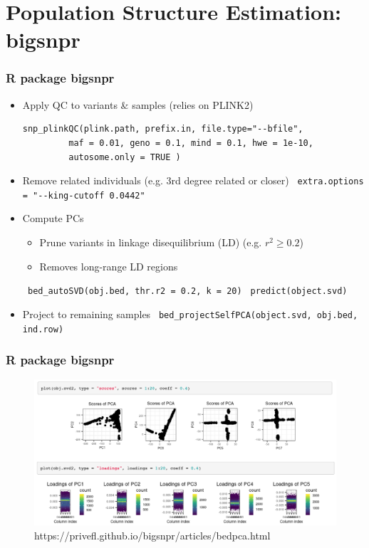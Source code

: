 \documentclass{beamer}
\begin{document}
\section{Population Structure Estimation: bigsnpr}

\begin{frame}[fragile]
	\frametitle{\bf R package bigsnpr}
	\begin{itemize}
			\item   Apply QC to variants \& samples (relies on PLINK2)
	\begin{verbatim} 
snp_plinkQC(plink.path, prefix.in, file.type="--bfile",  
		 maf = 0.01, geno = 0.1, mind = 0.1, hwe = 1e-10,
		 autosome.only = TRUE )
	\end{verbatim}
	\item Remove related individuals (e.g. 3rd degree related or closer)
	\verb| extra.options = "--king-cutoff 0.0442" |
\item Compute PCs
	\begin{itemize}
	\item Prune variants in linkage disequilibrium (LD) (e.g. $r^2 \geq 0.2$)
	\item Removes long-range LD regions
\end{itemize}
\verb| bed_autoSVD(obj.bed, thr.r2 = 0.2, k = 20)|
\verb| predict(object.svd)|
\item Project to remaining samples
\verb| bed_projectSelfPCA(object.svd, obj.bed, ind.row)|
	\end{itemize}
\end{frame}


\begin{frame}[fragile]
	\frametitle{\bf R package bigsnpr}
	\vspace{-1em}
		\begin{figure}
		\centering
		\includegraphics[scale=.40]{Figures/pca_bigsnpr}
		\caption{\scriptsize https://privefl.github.io/bigsnpr/articles/bedpca.html}
	\end{figure}
	

\end{frame}
\end{document}
